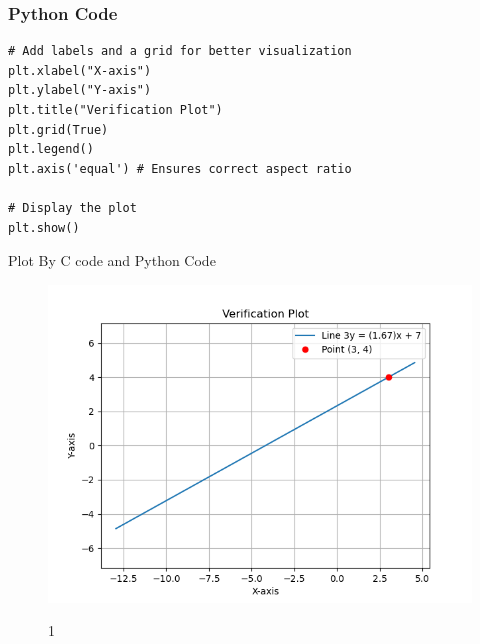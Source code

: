 \documentclass{beamer}
\begin{document}
\begin{frame}[fragile]
\frametitle{Python Code}
\begin{lstlisting}
# Add labels and a grid for better visualization
plt.xlabel("X-axis")
plt.ylabel("Y-axis")
plt.title("Verification Plot")
plt.grid(True)
plt.legend()
plt.axis('equal') # Ensures correct aspect ratio

# Display the plot
plt.show()
\end{lstlisting}
\end{frame}
\begin{frame}{Plot By C code and Python Code}
    \begin{figure}
    \centering
    \includegraphics[width=0.7\columnwidth]{figs/Figure_1.png}
    \label{fig:placeholder}
    \caption{1}
\end{figure}
\end{frame}
\end{document}
